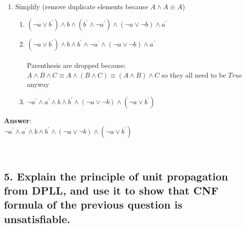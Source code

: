 \documentclass[a4paper, 14pt]{report}
\newcommand{\answer}[1]{%
	\begin{flushleft}
		\textbf{Answer}:\\
			#1
	\end{flushleft}}
\newcommand{\question}[1]{\subsection*{#1}}
\begin{document}
\begin{enumerate}
\begin{enumerate}
			\pagebreak

		\item Simplify (remove duplicate elements because $ A \wedge A \equiv A$)
		
			\begin{enumerate}		
				\item $ (\neg a \vee b^\prime) \wedge b \wedge (b^\prime \wedge \neg a^\prime) \wedge (\neg a \vee \neg b) \wedge a^\prime  $ \\ 
				\item $ (\neg a \vee b^\prime) \wedge b \wedge b^\prime \wedge \neg a^\prime \wedge (\neg a \vee \neg b) \wedge a^\prime  $ \\  \\
					Parenthesis are dropped because: $ A \wedge B \wedge C \equiv A \wedge (B \wedge C) \equiv (A \wedge B) \wedge C $
					so they all need to be $True$ anyway \\
				\item $ \neg a^\prime \wedge a^\prime \wedge b \wedge b^\prime \wedge (\neg a \vee \neg b)  \wedge (\neg a \vee b^\prime) $ \\ 
			\end{enumerate}		

	\end{enumerate}		
\end{enumerate}		

\hline

\answer{$ \neg a^\prime \wedge a^\prime \wedge b \wedge b^\prime \wedge (\neg a \vee \neg b)  \wedge (\neg a \vee b^\prime) $ \\} \\

\question{5. Explain the principle of unit propagation from DPLL, and use
  it to show that CNF formula of the previous question is unsatisfiable.}
\end{document}
